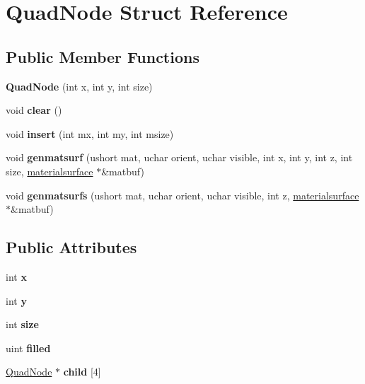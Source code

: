 \hypertarget{struct_quad_node}{}\section{Quad\+Node Struct Reference}
\label{struct_quad_node}
\subsection*{Public Member Functions}
\begin{DoxyCompactItemize}
\item 
\mbox{\label{struct_quad_node_a26288268bf04dd601f95bc912fb8d51d}} 
{\bfseries Quad\+Node} (int x, int y, int size)
\item 
\mbox{\label{struct_quad_node_ad2e159f5c5d05f8613e75115b88a3191}} 
void {\bfseries clear} ()
\item 
\mbox{\label{struct_quad_node_a6df08a129921958d59b779afa27e5d0e}} 
void {\bfseries insert} (int mx, int my, int msize)
\item 
\mbox{\label{struct_quad_node_a22e1bfb13e3c4bbee621402bcc4b1cbd}} 
void {\bfseries genmatsurf} (ushort mat, uchar orient, uchar visible, int x, int y, int z, int size, \hyperlink{structmaterialsurface}{materialsurface} $\ast$\&matbuf)
\item 
\mbox{\label{struct_quad_node_a1f3648238e137ee4c53e82f03f361ff5}} 
void {\bfseries genmatsurfs} (ushort mat, uchar orient, uchar visible, int z, \hyperlink{structmaterialsurface}{materialsurface} $\ast$\&matbuf)
\end{DoxyCompactItemize}
\subsection*{Public Attributes}
\begin{DoxyCompactItemize}
\item 
\mbox{\label{struct_quad_node_aea658922dda553655e6626f35c0db900}} 
int {\bfseries x}
\item 
\mbox{\label{struct_quad_node_a11c5735309894b2ff8a6b4f63f4f49b1}} 
int {\bfseries y}
\item 
\mbox{\label{struct_quad_node_a86de335099ae81ee0e1bd6147340768d}} 
int {\bfseries size}
\item 
\mbox{\label{struct_quad_node_ac0155b7f24db36446a1f2ba2cf77d294}} 
uint {\bfseries filled}
\item 
\mbox{\label{struct_quad_node_aa4dea7e2771c2ad2c23fc718e1a29393}} 
\hyperlink{struct_quad_node}{Quad\+Node} $\ast$ {\bfseries child} \mbox{[}4\mbox{]}
\end{DoxyCompactItemize}


